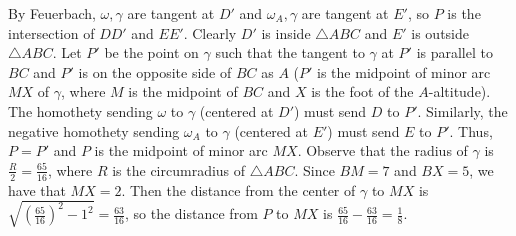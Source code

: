 By Feuerbach, $\omega,\gamma$ are tangent at $D'$ and $\omega_A,\gamma$ are tangent at $E'$, so $P$ is the intersection of $DD'$ and $EE'$. Clearly $D'$ is inside $\triangle{ABC}$ and $E'$ is outside $\triangle{ABC}$. Let $P'$ be the point on $\gamma$ such that the tangent to $\gamma$ at $P'$ is parallel to $BC$ and $P'$ is on the opposite side of $BC$ as $A$ ($P'$ is the midpoint of minor arc $MX$ of $\gamma$, where $M$ is the midpoint of $BC$ and $X$ is the foot of the $A$-altitude). The homothety sending $\omega$ to $\gamma$ (centered at $D'$) must send $D$ to $P'$. Similarly, the negative homothety sending $\omega_A$ to $\gamma$ (centered at $E'$) must send $E$ to $P'$. Thus, $P=P'$ and $P$ is the midpoint of minor arc $MX$. Observe that the radius of $\gamma$ is $\frac{R}{2}=\frac{65}{16}$, where $R$ is the circumradius of $\triangle{ABC}$. Since $BM=7$ and $BX=5$, we have that $MX=2$. Then the distance from the center of $\gamma$ to $MX$ is $\sqrt{\left(\frac{65}{16}\right)^2-1^2}=\frac{63}{16}$, so the distance from $P$ to $MX$ is $\frac{65}{16}-\frac{63}{16}=\boxed{\frac{1}{8}}$.